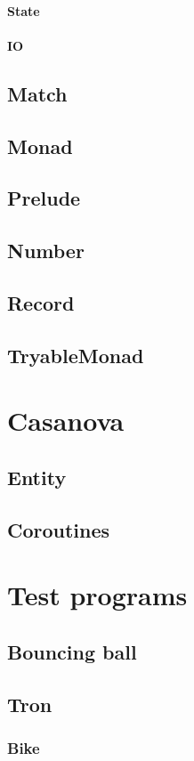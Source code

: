 \begin{multicols}{3}
\subsubsection{State}
\subsubsection{IO}
\section{Match}
\section{Monad}
\section{Prelude}
\section{Number}
\section{Record}
\section{TryableMonad}

\chapter{Casanova}
\section{Entity}
\section{Coroutines}

\chapter{Test programs}
\section{Bouncing ball}
\section{Tron}
\subsection{Bike}

\end{multicols}
